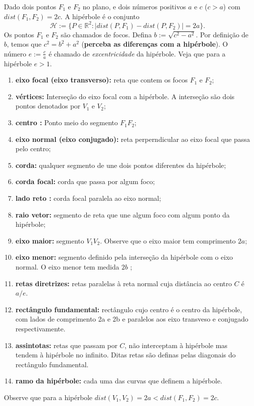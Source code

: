 \documentclass{article}
\begin{document}
 Dado dois pontos $F_1$ e $F_2$ no plano, e dois números positivos $a$ e $c$ ($c> a$)
   com $dist(F_1,F_2)=2c$.  
   A hipérbole é o conjunto  
   $$\mathcal{H}:=\{P \in \mathbb{R}^{2}: |dist(P,F_1)-dist(P,F_2)|=2a\}.$$
   Os pontos $F_1$ e $F_2$ são chamados de focos.
   Defina $b:=\sqrt{c^{2}-a^{2}}$. 
   Por definição de $b$, 
   temos que $c^{2}=b^2+a^2$ ({\bf perceba as diferenças com a hipérbole}). 
   O número $e:=\frac{c}{a}$ é chamado 
   de {\it excentricidade} da hipérbole. 
   Veja que para a hipérbole $e>1$.
    \begin{enumerate}
      \item {\bf eixo focal (eixo transverso): } reta que contem os focos $F_1$ e $F_2$;
      \item {\bf vértices:  } Interseção do eixo focal com a 
      hipérbole. 
      A interseção são dois pontos denotados por $V_1$ e $V_2$;
      \item {\bf centro : } Ponto meio do segmento $F_1F_2$;
      \item {\bf eixo normal (eixo conjugado): } reta perperndicular ao eixo focal que passa pelo centro; 
      \item {\bf corda: } qualquer segmento de une dois 
      pontos diferentes da hipérbole;
      \item {\bf corda focal: } corda que passa por algum foco;
      \item {\bf lado reto : } corda focal paralela ao eixo normal;
      \item {\bf raio vetor: } segmento de reta que une algum 
      foco com algum ponto da hipérbole;
      \item {\bf eixo maior: } segmento $V_1V_2$. 
      Observe que o eixo maior tem comprimento $2a$;
      \item {\bf eixo menor: } segmento definido pela interseção 
      da hipérbole com o eixo normal. 
      O eixo menor tem medida $2b$ ;
      \item {\bf retas diretrizes: }  retas paralelas à reta normal 
      cuja distância ao centro $C$ é $a/e$.
      \item {\bf rectângulo fundamental: } rectângulo cujo centro é o centro da hipérbole, com lados de comprimento 2a e 2b e paralelos aos eixo transveso e 
      conjugado respectivamente.
      \item {\bf assintotas: } retas que passam por $C$, não interceptam 
      à hipérbole mas tendem à hipérbole no infinito. 
      Ditas retas são definas pelas diagonais do rectângulo fundamental. 
      \item {\bf ramo da hipérbole: }  cada uma das curvas que definem a hipérbole.
     \end{enumerate}
     Observe que para a hipérbole
     $ dist(V_1,V_2)=2a < dist(F_1,F_2)=2c $.
 
\end{document}
